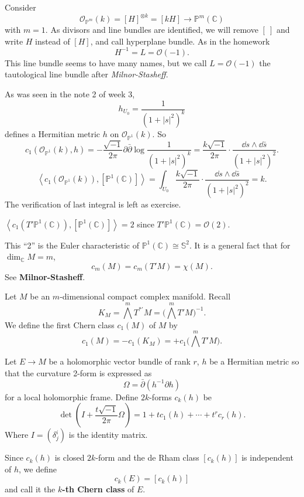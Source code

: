 \documentclass[12pt]{article}
\begin{document}
\begin{example}
  Consider \[
    \mathcal{O}_{\mathbb{P}^m}(k)=[H]^{\otimes k}=[kH]\to \mathbb{P}^m(\mathbb{C})
  \] with \(m=1\). As divisors and line bundles are identified, we will remove
  \([\ ]\) and write \(H\) instead of \([H]\), and call hyperplane bundle. As in the
  homework \[
    H^{-1}=L=\mathcal{O}(-1)
  .\] This line bundle seems to have many names, but we call \(L=\mathcal{O}(-1)\)
  the tautological line bundle after \emph{Milnor-Stasheff}.

  As was seen in the note 2 of week 3, \[
    h_{U_0}=\frac{1}{(1+|s|^2)^k}
  \] defines a Hermitian metric \(h\) on \(\mathcal{O}_{\mathbb{P}^1}(k)\). So \[
    c_1(\mathcal{O}_{\mathbb{P}^1}(k),h)=-\frac{\sqrt{-1}}{2\pi}\partial\bar{\partial}
    \log \frac{1}{(1+|s|^2)^k}
    =\frac{k\sqrt{-1}}{2\pi}\cdot \frac{\dd{s}\wedge \dd{\bar{s}}}{(1+|s|^2)^2}
  .\] \[
    \left<c_1(\mathcal{O}_{\mathbb{P}^1}(k)),[\mathbb{P}^1(\mathbb{C})]\right> 
    =\int_{U_0}\frac{k\sqrt{-1}}{2\pi}\cdot\frac{\dd{s}\wedge\dd{\bar{s}}}{(1+|s|^2)^2}
    =k
  .\]
  The verification of last integral is left as exercise.
\end{example}

\begin{corollary}
  \(\left<c_1(T'\mathbb{P}^1(\mathbb{C})),[\mathbb{P}^1(\mathbb{C})]\right> =2\)
  since \(T'\mathbb{P}^1(\mathbb{C})=\mathcal{O}(2)\).
\end{corollary}

\begin{remark}
  This ``2'' is the Euler characteristic of \(\mathbb{P}^1(\mathbb{C})\cong
  \mathbb{S}^2\). It is a general fact that for \(\dim_{\mathbb{C}}M=m\), \[
    c_m(M)=c_m(T'M)=\chi(M)
  .\] See \textbf{Milnor-Stasheff}.
\end{remark}

\begin{definition}
  Let \(M\) be an \(m\)-dimensional compact complex manifold. Recall \[
    K_M=\bigwedge^m T^{*\prime}M=\Big(\bigwedge^m T'M\Big)^{-1}
  .\] We define the first Chern class \(c_1(M)\) of \(M\) by \[
    c_1(M)=-c_1(K_M)=+c_1\Big(\bigwedge^m T'M\Big)
  .\] 
\end{definition}

\begin{definition}
  Let \(E\to M\) be a holomorphic vector bundle of rank \(r\), \(h\) be a Hermitian
  metric so that the curvature 2-form is expressed as \[
    \Omega=\bar{\partial}(h^{-1}\partial h)
  \] for a local holomorphic frame. Define \(2k\)-forms \(c_k(h)\) be \[
    \det(I+\frac{t\sqrt{-1}}{2\pi}\Omega)=1+tc_1(h)+\cdots +t^r c_r(h)
  .\] Where \(I=(\delta^i_j)\) is the identity matrix.
  
  Since \(c_k(h)\) is closed \(2k\)-form and the de Rham class \([c_k(h)]\) is
  independent of \(h\), we define \[
    c_k(E)=[c_k(h)]
  \] and call it the \textbf{\(k\)-th Chern class} of \(E\).
\end{definition}
\end{document}
